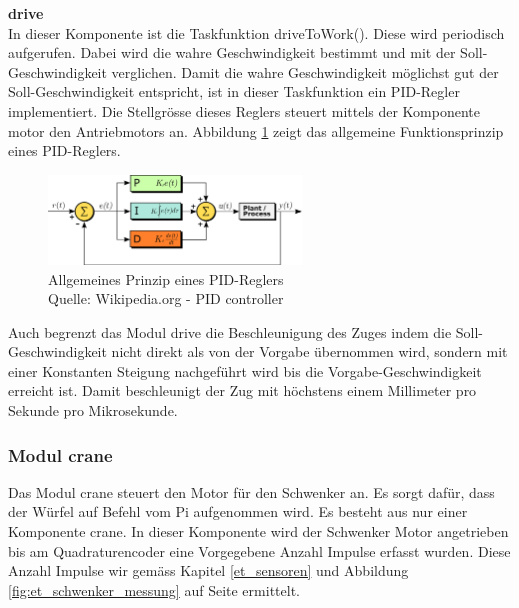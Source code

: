 \documentclass[../../main.tex]{subfiles}
\begin{document}
    \textbf{drive}\\
    In dieser Komponente ist die Taskfunktion driveToWork(). Diese wird periodisch aufgerufen. Dabei wird die wahre Geschwindigkeit bestimmt und mit der Soll-Geschwindigkeit verglichen. Damit die wahre Geschwindigkeit möglichst gut der Soll-Geschwindigkeit entspricht, ist in dieser Taskfunktion ein PID-Regler implementiert. Die Stellgrösse dieses Reglers steuert mittels der Komponente motor den Antriebmotors an. Abbildung \ref{fig:et_drive_pid} zeigt das allgemeine Funktionsprinzip eines PID-Reglers. 
    \nocite{PIDcontroller}

    \begin{figure}[H]
        \centering
        \includegraphics[width=0.6\textwidth]{../../images/et/et_wiki_PID_en.png}
        \caption {Allgemeines Prinzip eines PID-Reglers\\Quelle: Wikipedia.org - PID controller}
        \label{fig:et_drive_pid}
    \end{figure}

    Auch begrenzt das Modul drive die Beschleunigung des Zuges indem die Soll-Geschwindigkeit nicht direkt als von der Vorgabe übernommen wird, sondern mit einer Konstanten Steigung nachgeführt wird bis die Vorgabe-Geschwindigkeit erreicht ist. Damit beschleunigt der Zug mit höchstens einem Millimeter pro Sekunde pro Mikrosekunde.\\

    \subsubsection{Modul crane}
    Das Modul crane steuert den Motor für den Schwenker an. Es sorgt dafür, dass der Würfel auf Befehl vom Pi aufgenommen wird. Es besteht aus nur einer Komponente crane. In dieser Komponente wird der Schwenker Motor angetrieben bis am Quadraturencoder eine Vorgegebene Anzahl Impulse erfasst wurden. Diese Anzahl Impulse wir gemäss Kapitel \ref{et_sensoren} und Abbildung \ref{fig:et_schwenker_messung} auf Seite \pageref{fig:et_schwenker_messung} ermittelt.
    
\end{document}
